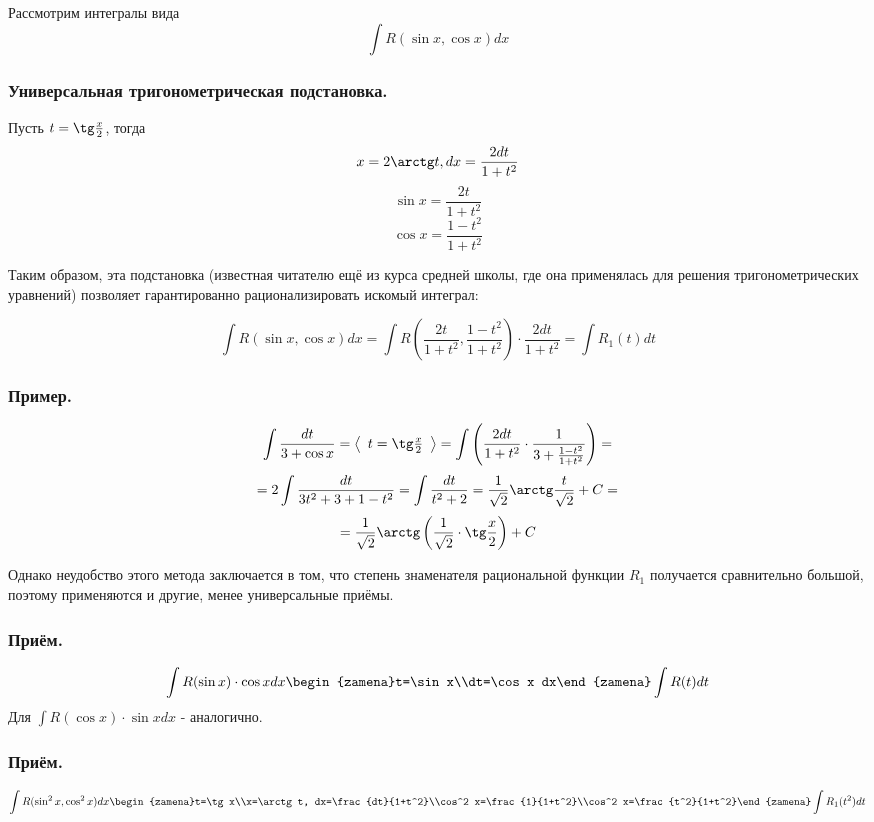 Рассмотрим интегралы вида 
$$\int R(\sin x,\cos x)dx$$

\subsubsection{Универсальная тригонометрическая подстановка.}
Пусть $t=\tg\frac{x}{2}$, тогда 
$$x=2\arctg t, dx=\frac{2dt}{1+t^2}$$
$$\sin x=\frac{2t}{1+t^2}$$
$$\cos x=\frac{1-t^2}{1+t^2}$$

Таким образом, эта подстановка (известная читателю ещё из курса средней школы, где она применялась для решения тригонометрических уравнений) позволяет гарантированно рационализировать искомый интеграл:

$$\int R(\sin x,\cos x)dx=\int R(\frac{2t}{1+t^2},\frac{1-t^2}{1+t^2})\cdot \frac{2dt}{1+t^2}=\int R_1(t)dt$$

\subsubsection{Пример.}

$$\int \frac{dt}{3+\cos x}=
\left<\begin{array}{c}
t=\tg\frac{x}{2}
\end{array}\right>=
\int\left(\frac{2dt}{1+t^2}\cdot\frac{1}{3+\frac{1-t^2}{1+t^2}}\right)=$$
$$=2\int\frac{dt}{3t^2+3+1-t^2}=\int\frac{dt}{t^2+2}=
\frac{1}{\sqrt{2}}\arctg\frac{t}{\sqrt{2}}+C=$$$$=
\frac{1}{\sqrt{2}}\arctg\left(\frac{1}{\sqrt{2}}\cdot \tg\frac{x}{2}\right)+C$$

Однако неудобство этого метода заключается в том, что степень знаменателя рациональной функции $R_1$ получается сравнительно большой, поэтому применяются и другие, менее универсальные приёмы.

\subsubsection{Приём.}
$$\int R(\sin x)\cdot \cos x dx \begin{zamena}t=\sin x\\dt=\cos x dx\end{zamena}\int R(t)dt$$
Для $\int R(\cos x) \cdot \sin x dx$ - аналогично.

\subsubsection{Приём.}
$$\int R(\sin^2 x, \cos^2 x) dx \begin{zamena}t=\tg x\\x=\arctg t, dx=\frac{dt}{1+t^2}\\cos^2 x=\frac{1}{1+t^2}\\cos^2 x=\frac{t^2}{1+t^2}\end{zamena}\int R_1(t^2)dt$$


